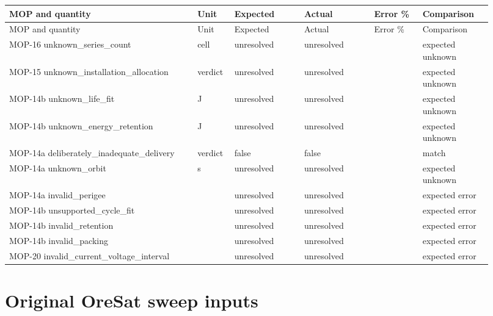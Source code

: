 \begingroup\scriptsize\setlength{\tabcolsep}{2pt}\setlength{\parskip}{0pt}
\begin{longtable}{@{}>{\raggedright\arraybackslash}p{0.3588\linewidth} >{\raggedright\arraybackslash}p{0.0552\linewidth} >{\raggedright\arraybackslash}p{0.138\linewidth} >{\raggedright\arraybackslash}p{0.138\linewidth} >{\raggedright\arraybackslash}p{0.09200000000000001\linewidth} >{\raggedright\arraybackslash}p{0.138\linewidth}@{}}
\toprule
MOP and quantity & Unit & Expected & Actual & Error \% & Comparison \\ \midrule
\endfirsthead
\toprule
MOP and quantity & Unit & Expected & Actual & Error \% & Comparison \\ \midrule
\endhead
\bottomrule\endfoot
MOP-16 unknown\_\allowbreak{}series\_\allowbreak{}count & cell & unresolved & unresolved &  & expected unknown \\
MOP-15 unknown\_\allowbreak{}installation\_\allowbreak{}allocation & verdict & unresolved & unresolved &  & expected unknown \\
MOP-14b unknown\_\allowbreak{}life\_\allowbreak{}fit & J & unresolved & unresolved &  & expected unknown \\
MOP-14b unknown\_\allowbreak{}energy\_\allowbreak{}retention & J & unresolved & unresolved &  & expected unknown \\
MOP-14a deliberately\_\allowbreak{}inadequate\_\allowbreak{}delivery & verdict & false & false &  & match \\
MOP-14a unknown\_\allowbreak{}orbit & s & unresolved & unresolved &  & expected unknown \\
MOP-14a invalid\_\allowbreak{}perigee &  & unresolved & unresolved &  & expected error \\
MOP-14b unsupported\_\allowbreak{}cycle\_\allowbreak{}fit &  & unresolved & unresolved &  & expected error \\
MOP-14b invalid\_\allowbreak{}retention &  & unresolved & unresolved &  & expected error \\
MOP-14b invalid\_\allowbreak{}packing &  & unresolved & unresolved &  & expected error \\
MOP-20 invalid\_\allowbreak{}current\_\allowbreak{}voltage\_\allowbreak{}interval &  & unresolved & unresolved &  & expected error \\
\end{longtable}\endgroup

\section{Original OreSat sweep inputs}

